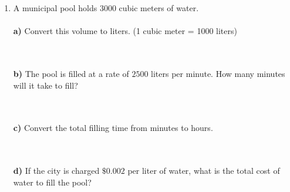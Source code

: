 \documentclass[12pt, letterpaper, fleqn]{article}
\begin{document}
\begin{enumerate}[itemsep=2.5cm, leftmargin=0.6cm]
\item A municipal pool holds $3000$ cubic meters of water. \\ \\
\textbf{a)} Convert this volume to liters. (1 cubic meter = 1000 liters) \\ \\
 \\
\vspace{2cm}

\textbf{b)} The pool is filled at a rate of $2500$ liters per minute. How many minutes will it take to fill? \\ \\
 \\
\vspace{2cm}

\textbf{c)} Convert the total filling time from minutes to hours. \\ \\
 \\
\vspace{2cm}

\textbf{d)} If the city is charged $\$0.002$ per liter of water, what is the total cost of water to fill the pool? \\ \\

\end{enumerate}
\end{document}
